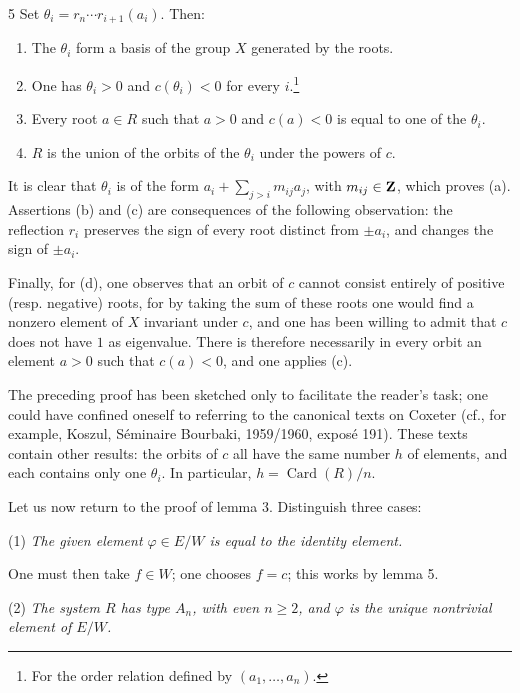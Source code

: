 \begin{lemma}{5}\label{XIV.5}
Set $\theta_i=r_n\cdots r_{i+1}(a_i)$. Then:
\begin{enumerate}[label=\textup{(\alph*)}]
\item The $\theta_i$ form a basis of the group $X$
generated by the roots.
\item One has $\theta_i>0$ and $c(\theta_i)<0$ for
every $i$.\footnote{For the order relation defined
by $(a_1,\ldots,a_n)$.}
\item Every root $a\in R$ such that $a>0$ and
$c(a)<0$ is equal to one of the $\theta_i$.
\item $R$ is the union of the orbits of the
$\theta_i$ under the powers of $c$.
\end{enumerate}
\end{lemma}
It is clear that $\theta_i$ is of the form
$a_i+\sum_{j>i}m_{ij}a_j$, with $m_{ij}\in\mathbf{Z}$,
which proves (a). Assertions (b) and (c)
are consequences of the following observation:
the reflection $r_i$ preserves the sign of
every root distinct from $\pm a_i$, and
changes the sign of $\pm a_i$.

Finally, for (d), one observes that an
orbit of $c$ cannot consist entirely
of positive (resp. negative) roots,
for by taking the sum of these roots
one would find a nonzero element of
$X$ invariant under $c$, and one has
been willing to admit that $c$ does
not have $1$ as eigenvalue. There
is therefore necessarily in every
orbit an element $a>0$ such that
$c(a)<0$, and one applies (c).

\begin{remark*}
The preceding proof has been sketched
only to facilitate the reader's task;
one could have confined oneself to
referring to the canonical texts on
Coxeter (cf., for example, Koszul,
S\'eminaire Bourbaki, 1959/1960,
expos\'e 191). These texts contain
other results: the orbits of $c$
all have the same number $h$ of
elements, and each contains only
one $\theta_i$. In particular,
$h=\operatorname{Card}(R)/n$.
\end{remark*}

Let us now return to the proof
of lemma 3. Distinguish three cases:

\noindent (1) \emph{The given element
$\varphi\in E/W$ is equal to the
identity element.}

One must then take $f\in W$;
one chooses $f=c$; this works
by lemma 5.

\noindent (2) \emph{The system $R$
has type $A_n$, with even $n\geq2$,
and $\varphi$ is the unique
nontrivial element of $E/W$.}

